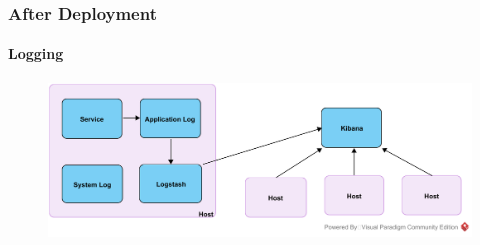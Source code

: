 \documentclass{beamer}
\begin{document}
\begin{frame}
\begin{columns}
\begin{column}{.49\textwidth}
\begin{figure}
\begin{center}
 			\par
		\end{center}
	\end{figure}
\end{column}
\end{columns}
\end{frame}

\begin{frame}
	\frametitle{After Deployment}
	\framesubtitle{Logging}
	\begin{figure}
		\begin{center}
			\includegraphics[scale=0.6]{logging}
		\end{center}
	\end{figure}
\end{frame}
\end{document}
